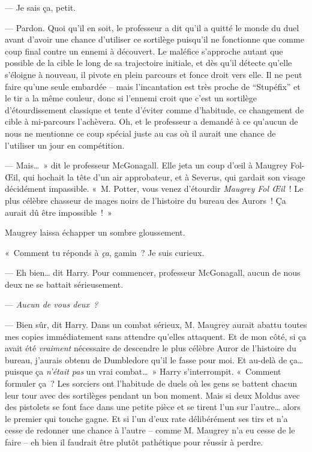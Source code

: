 --- Je sais ça, petit.

--- Pardon. Quoi qu'il en soit, le professeur a dit qu'il a quitté le monde du duel avant d'avoir une chance d'utiliser ce sortilège puisqu'il ne fonctionne que comme coup final contre un ennemi à découvert. Le maléfice s'approche autant que possible de la cible le long de sa trajectoire initiale, et dès qu'il détecte qu'elle s'éloigne à nouveau, il pivote en plein parcours et fonce droit vers elle. Il ne peut faire qu'une seule embardée -- mais l'incantation est très proche de “Stupéfix” et le tir a la même couleur, donc si l'ennemi croit que c'est un sortilège d'étourdissement classique et tente d'éviter comme d'habitude, ce changement de cible à mi-parcours l'achèvera. Oh, et le professeur a demandé à ce qu'aucun de nous ne mentionne ce coup spécial juste au cas où il aurait une chance de l'utiliser un jour en compétition.

--- Mais…~» dit le professeur McGonagall. Elle jeta un coup d'œil à Maugrey Fol-Œil, qui hochait la tête d'un air approbateur, et à Severus, qui gardait son visage décidément impassible. «~M. Potter, vous venez d'étourdir \emph{Maugrey Fol Œil}~! Le plus célèbre chasseur de mages noirs de l'histoire du bureau des Aurors~! Ça aurait dû être impossible~!~»

Maugrey laissa échapper un sombre gloussement.

«~Comment tu réponds à \emph{ça}, gamin~? Je suis curieux.

--- Eh bien… dit Harry. Pour commencer, professeur McGonagall, aucun de nous deux ne se battait sérieusement.

--- \emph{Aucun de vous deux~?}

--- Bien sûr, dit Harry. Dans un combat sérieux, M. Maugrey aurait abattu toutes mes copies immédiatement sans attendre qu'elles attaquent. Et de mon côté, si ça avait été \emph{vraiment} nécessaire de descendre le plus célèbre Auror de l'histoire du bureau, j'aurais obtenu de Dumbledore qu'il le fasse pour moi. Et au-delà de ça… puisque ça \emph{n'était pas} un vrai combat…~» Harry s'interrompit. «~Comment formuler ça~? Les sorciers ont l'habitude de duels où les gens se battent chacun leur tour avec des sortilèges pendant un bon moment. Mais si deux Moldus avec des pistolets se font face dans une petite pièce et se tirent l'un sur l'autre… alors le premier qui touche gagne. Et si l'un d'eux rate délibérément ses tirs et n'a cesse de redonner une chance à l'autre -- comme M. Maugrey n'a eu cesse de le faire -- eh bien il faudrait être plutôt pathétique pour réussir à perdre.


